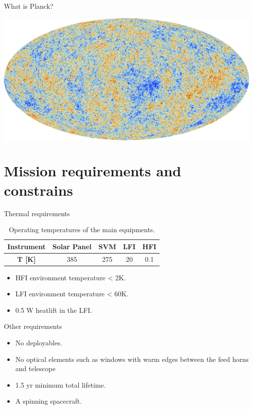 \documentclass{cubeamer}
\begin{document}
\begin{frame}{What is Planck?}
\begin{minipage}{0.3\textwidth}
    \includegraphics[width=0.9\linewidth]{Figures/Planck2.jpg}
    \end{minipage}
    
\end{frame}

\section{Mission requirements and constrains}

\begin{frame}{Thermal requirements}
\begin{table}[H]
\begin{center}
\caption{Operating temperatures of the main equipments.}
\label{tab:ej2}
\begin{tabular}{c c c c c}
\toprule
\textbf{Instrument} & \textbf{Solar Panel} &  \textbf{SVM} & \textbf{LFI} & \textbf{HFI} \\ \midrule
\textbf{ $\boldsymbol{T}$ [K]} & 385 & 275 & 20 & 0.1 \\
\bottomrule
\end{tabular}
\end{center}
\end{table}

   \begin{itemize}
   \item HFI environment temperature < 2K.
   \item LFI environment temperature < 60K.
   \item 0.5 W heatlift in the LFI.
   \end{itemize}

\end{frame}

\begin{frame}{Other requirements}

   
\begin{itemize}
   \item No deployables.
   \item No optical elements such as windows with warm edges between the feed horns and telescope 
   \item 1.5 yr minimum total lifetime.
   \item A spinning spacecraft.
   \end{itemize}   
\end{frame}
\end{document}
